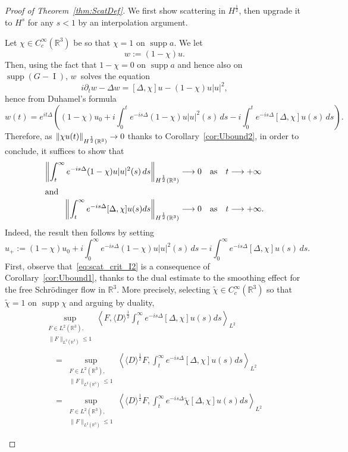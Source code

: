 \documentclass[AHL,Unicode,longabstracts,published]{cedram}
\newcommand*\R{\mathbb{R}}
\DeclareMathOperator{\I}{I}
\DeclareMathOperator{\supp}{supp}
\renewcommand*{\to}{\mathchoice{\longrightarrow}{\rightarrow}{\rightarrow}{\rightarrow}}
\begin{document}
\begin{proof}[Proof of Theorem~\ref{thm:ScatDef}]
We first show scattering in $H^{\frac 12}$, then upgrade it to $H^s$ for any $s<1$ by an interpolation argument.

Let $\chi \in C^\infty_c(\R^3)$ be so that $\chi = 1$ on $\supp a$. We let
\[
w := (1-\chi)u.
\]
Then, using the fact that $1-\chi = 0$ on $\supp a$ and hence also on $\supp (G-\I )$, $w$~solves the equation
\[
i\partial_t w - \Delta w = [\Delta, \chi] u - (1-\chi)u|u|^{2},
\]
hence from Duhamel's formula
\[
w(t) = e^{it \Delta}\left((1-\chi) u_0 + i \int_0^t e^{-is\Delta} (1-\chi)u|u|^{2}(s) \, ds - i \int_0^t e^{-is\Delta}[\Delta, \chi] u(s) \, ds \right).
\]
Therefore, as $\| \chi u(t) \|_{H^{\frac 12}(\R^3)} \to 0$ thanks to Corollary~\ref{cor:Ubound2}, in order to conclude, it suffices to show that
\begin{align}
\left\| \int_t^\infty e^{-is\Delta} (1-\chi)u|u|^{2}(s) \, ds \right\|_{H^{\frac 12}(\R^3)} &\to 0 \quad\text{as}\quad t\to +\infty\label{eq:scat_crit_I1}
\\
\intertext{and}
\left\| \int_t^\infty e^{-is\Delta}[\Delta, \chi] u(s) ds \right\|_{H^{\frac 12}(\R^3)} &\to 0 \quad\text{as}\quad t\to +\infty.\label{eq:scat_crit_I2}
\end{align}
Indeed, the result then follows by setting
\[
u_+ := (1-\chi) u_0 + i \int_0^\infty e^{-is\Delta} (1-\chi)u|u|^{2}(s) \, ds - i \int_0^\infty e^{-is\Delta}[\Delta, \chi] u(s) \, ds.
\]
First, observe that~\eqref{eq:scat_crit_I2} is a consequence of Corollary~\ref{cor:Ubound1}, thanks to the dual estimate to the smoothing effect for the free Schr{\"o}dinger flow in $\R^3$. More precisely, selecting $\widetilde \chi \in C^\infty_c(\R^3)$ so that $\widetilde \chi = 1$ on $\supp \chi$ and arguing by duality,
\begin{multline*}
\sup_{\substack{F \in L^2(\R^3), \\ \| F \|_{L^2(\R^3)} \leq 1}} \left\langle F, \langle D \rangle^{\frac 12} \int_t^\infty e^{-is\Delta}[\Delta, \chi] u(s) ds \right\rangle_{L^2} \\
\begin{aligned}
& = \sup_{\substack{F \in L^2(\R^3), \\ \| F \|_{L^2(\R^3)} \leq 1}} \left\langle \langle D \rangle^{\frac 12} F, \int_t^\infty e^{-is\Delta}[\Delta, \chi] u(s) ds \right\rangle_{L^2} \\
&= \sup_{\substack{F \in L^2(\R^3), \\ \| F \|_{L^2(\R^3)} \leq 1}} \left\langle \langle D \rangle^{\frac 12} F, \int_t^\infty e^{-is\Delta}\widetilde \chi [\Delta, \chi] u(s) ds \right\rangle_{L^2} \\

\end{aligned}
\end{multline*}
\end{proof}
\end{document}
